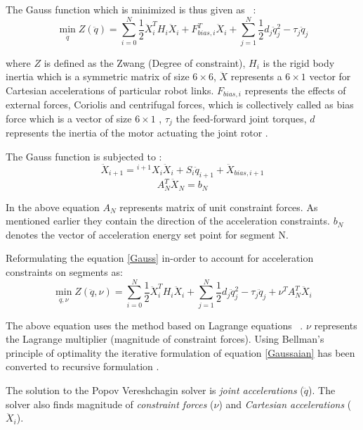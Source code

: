 The Gauss function which is minimized is thus given as ~\cite{vereshchagin1989modeling}:
\begin{equation}
\label{Gauss}
\min_{\ddot{q}} Z (\ddot{q}) = \sum_{i=0}^{N}\frac{1}{2}\ddot{X}_{i}^{T}H_{i}\ddot{X}_{i} + F_{bias,i}^{T}\ddot{X}_{i}+ \sum_{j=1}^{N}\frac{1}{2}d_{j}\ddot{q}_{j}^{2} - \tau_{j}\ddot{q}_{j}
\end{equation}


where $Z$ is defined as the Zwang (Degree of constraint), $H_{i}$ is the rigid body inertia which is a symmetric matrix of size $6\times 6 $, $\ddot{X}$ represents a $6\times 1$ vector for Cartesian accelerations of particular robot links. $F_{bias,i}$ represents the effects of external forces, Coriolis and centrifugal forces, which is collectively called as bias force which is a vector of size $6\times 1$ , $\tau_{j}$ the feed-forward joint torques, $d$ represents the inertia of the \color{red}motor actuating the joint \color{black}rotor \cite{vereshchagin1989modeling}. 


The Gauss function is subjected to \cite{vukcevic2018extending}: 
$$
\ddot{X}_{i+1} = {^{i+1}X_{i}} \ddot{X}_{i} + S_{i}\ddot{q}_{i+1}+ \ddot{X}_{bias,i+1}$$
$$A_{N}^{T}\ddot{X}_{N} = b_{N}$$


In the above equation $A_{N}$ represents matrix of unit constraint forces. As mentioned earlier they contain the direction of the acceleration constraints. $b_{N}$ denotes the vector of acceleration energy set point for segment N.


Reformulating the equation \ref{Gauss} in-order to account for acceleration constraints on segments as: 
\begin{equation}
\min_{\ddot q,\nu}   Z(\ddot{q},\nu)  = \sum_{i=0}^{N}\frac{1}{2}\ddot{X}_{i}^{T}H_{i}\ddot{X}_{i} +  \sum_{j=1}^{N}\frac{1}{2}d_{j}\ddot{q}_{j}^{2} - \tau_{j}\ddot{q}_{j} + \nu^{T}A_{N}^{T}\ddot{X}_{i}
\label{Gaussaian}
\end{equation}


The above equation uses the method based on Lagrange equations ~\cite{shakhimardanov2015composable}\cite{lagrange1853mecanique}. $\nu$ represents the Lagrange multiplier (magnitude of constraint forces). Using Bellman's principle of optimality the iterative formulation of equation \ref{Gaussaian} has been converted to recursive formulation \cite{bellman1952theory}.


The solution to the Popov Vereshchagin solver is \textit{joint accelerations} ($\ddot{q}$). The solver also finds magnitude of \textit{constraint forces} ($\nu$) and \textit{Cartesian accelerations} ($\ddot{X}_{i}$).



